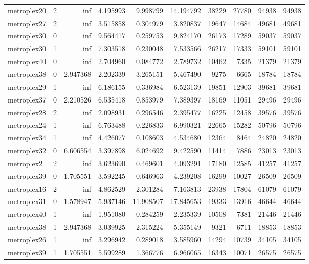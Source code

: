 \begin{longtable}{|l|r|r|r|r|r|r|r|r|r|}
metroplex20 & 2 & inf & 4.195993 & 9.998799 & 14.194792 & 38229 & 27780 & 94938 & 94938 \\
metroplex27 & 2 & inf & 3.515858 & 0.304979 & 3.820837 & 19647 & 14684 & 49681 & 49681 \\
metroplex30 & 0 & inf & 9.564417 & 0.259753 & 9.824170 & 26173 & 17289 & 59037 & 59037 \\
metroplex30 & 1 & inf & 7.303518 & 0.230048 & 7.533566 & 26217 & 17333 & 59101 & 59101 \\
metroplex40 & 0 & inf & 2.704960 & 0.084772 & 2.789732 & 10462 & 7335 & 21379 & 21379 \\
metroplex38 & 0 & 2.947368 & 2.202339 & 3.265151 & 5.467490 & 9275 & 6665 & 18784 & 18784 \\
metroplex29 & 1 & inf & 6.186155 & 0.336984 & 6.523139 & 19851 & 12903 & 39681 & 39681 \\
metroplex37 & 0 & 2.210526 & 6.535418 & 0.853979 & 7.389397 & 18169 & 11051 & 29496 & 29496 \\
metroplex28 & 2 & inf & 2.098931 & 0.296546 & 2.395477 & 16225 & 12458 & 39576 & 39576 \\
metroplex24 & 1 & inf & 6.763488 & 0.226833 & 6.990321 & 22665 & 15282 & 50796 & 50796 \\
metroplex34 & 1 & inf & 4.426077 & 0.108603 & 4.534680 & 12364 & 8464 & 24820 & 24820 \\
metroplex32 & 0 & 6.606554 & 3.397898 & 6.024692 & 9.422590 & 11414 & 7886 & 23013 & 23013 \\
metroplex2 & 2 & inf & 3.623690 & 0.469601 & 4.093291 & 17180 & 12585 & 41257 & 41257 \\
metroplex39 & 0 & 1.705551 & 3.592245 & 0.646963 & 4.239208 & 16299 & 10027 & 26509 & 26509 \\
metroplex16 & 2 & inf & 4.862529 & 2.301284 & 7.163813 & 23938 & 17804 & 61079 & 61079 \\
metroplex31 & 0 & 1.578947 & 5.937146 & 11.908507 & 17.845653 & 19333 & 13916 & 46644 & 46644 \\
metroplex40 & 1 & inf & 1.951080 & 0.284259 & 2.235339 & 10508 & 7381 & 21446 & 21446 \\
metroplex38 & 1 & 2.947368 & 3.039925 & 2.315224 & 5.355149 & 9321 & 6711 & 18853 & 18853 \\
metroplex26 & 1 & inf & 3.296942 & 0.289018 & 3.585960 & 14294 & 10739 & 34105 & 34105 \\
metroplex39 & 1 & 1.705551 & 5.599289 & 1.366776 & 6.966065 & 16343 & 10071 & 26575 & 26575 \\

\end{longtable}
